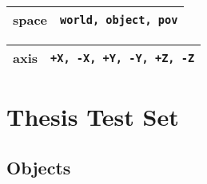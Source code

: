\documentclass[10pt, a4paper]{article}
\begin{document}

\begin{table}[H]
\def\baselinestretch{1}
{\small
\begin{tabular}{|l|l|}
\hline
{\sc space} & {\tt world, object, pov} \\
\hline
\end{tabular}
} 
\def\baselinestretch{1.9}
\end{table}

\begin{table}[H]
\def\baselinestretch{1}
{\small
\begin{tabular}{|l|l|}
\hline
{\sc axis} & {\tt +X, -X, +Y, -Y, +Z, -Z} \\
\hline
\end{tabular}
} 
\def\baselinestretch{1.9}
\end{table}

\section{Thesis Test Set}

\subsection{Objects}
\end{document}
